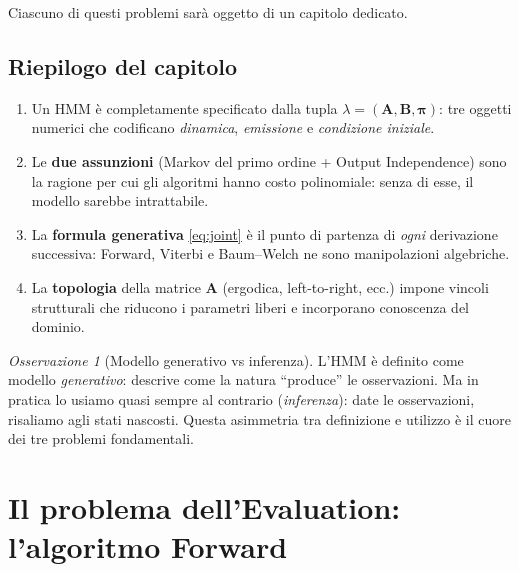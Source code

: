\documentclass[11pt,a4paper,oneside]{book}
\theoremstyle{plain}
\theoremstyle{definition}
\theoremstyle{remark}
\newtheorem{osservazione}[teorema]{Osservazione}
\newcommand{\Amat}{\mathbf{A}}               %
\newcommand{\Bmat}{\mathbf{B}}               %
\newcommand{\initvec}{\boldsymbol{\pi}}      %
\newcommand{\hmm}{\lambda}                   %
\begin{document}
Ciascuno di questi problemi sarà oggetto di un capitolo dedicato.

\section{Riepilogo del capitolo}

\begin{tcolorbox}[insightbox,title=Takeaway -- Capitolo 2]
\begin{enumerate}[leftmargin=*]
    \item Un HMM è completamente specificato dalla tupla
          $\hmm=(\Amat,\Bmat,\initvec)$: tre oggetti numerici che
          codificano \emph{dinamica}, \emph{emissione} e
          \emph{condizione iniziale}.
    \item Le \textbf{due assunzioni} (Markov del primo ordine +
          Output Independence) sono la ragione per cui gli algoritmi
          hanno costo polinomiale: senza di esse, il modello sarebbe
          intrattabile.
    \item La \textbf{formula generativa} \eqref{eq:joint} è il punto
          di partenza di \emph{ogni} derivazione successiva: Forward,
          Viterbi e Baum--Welch ne sono manipolazioni algebriche.
    \item La \textbf{topologia} della matrice $\Amat$ (ergodica,
          left-to-right, ecc.) impone vincoli strutturali che riducono
          i parametri liberi e incorporano conoscenza del dominio.
\end{enumerate}
\end{tcolorbox}

\begin{osservazione}[Modello generativo vs inferenza]
L'HMM è definito come modello \emph{generativo}: descrive come la
natura ``produce'' le osservazioni. Ma in pratica lo usiamo quasi
sempre al contrario (\emph{inferenza}): date le osservazioni, risaliamo
agli stati nascosti. Questa asimmetria tra definizione e utilizzo è il
cuore dei tre problemi fondamentali.
\end{osservazione}

\chapter{Il problema dell'Evaluation: l'algoritmo Forward}
\label{ch:forward}
\end{document}
